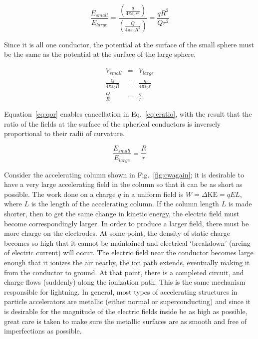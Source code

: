 \documentclass[12pt]{article}
\begin{document}
\begin{flushleft}
\begin{equation}
\frac{E_{small}}{E_{large}} = \frac{\left(\frac{q}{4\pi\varepsilon_{0}r^{2}}\right)}{\left( \frac{Q}{4\pi\varepsilon_{0}R^{2}} \right)}
=\frac{ qR^{2} }{ Qr^{2} }
\label{eq:eratio}
\end{equation}  

Since it is all one conductor, the potential at the surface of the small sphere must be the same as the potential at the surface of the large sphere,

\begin{eqnarray}
V_{small} & = & V_{large} \nonumber \\
\frac{Q}{4\pi\varepsilon_{0}R} & = & \frac{q}{4\pi\varepsilon_{0}r} \nonumber \\
\frac{Q}{R} & = & \frac{q}{r} \label{eq:qor}
\end{eqnarray}

Equation~\ref{eq:qor} enables cancellation in Eq.~\ref{eq:eratio}, with the result that the ratio of the fields at the surface of the spherical conductors is inversely proportional to their radii of curvature.

\begin{equation*}
\frac{E_{small}}{E_{large}} =\frac{ R }{ r }
\end{equation*}  

Consider the accelerating column shown in Fig.~\ref{fig:cwagain}; it is desirable to have a very large accelerating field in the column so that it can be as short as possible.  The work done on a charge $q$ in a uniform field is $W=\Delta \mbox{KE}= qEL$, where $L$ is the length of the accelerating column.  If the column length $L$ is made shorter, then to get the same change in kinetic energy, the electric field must become correspondingly larger.  In order to produce a larger field, there must be more charge on the electrodes.  At some point, the density of static charge becomes so high that it cannot be maintained and electrical `breakdown' (arcing of electric current) will occur.  The electric field near the conductor becomes large enough that it ionizes the air nearby, the ion path extends, eventually making it from the conductor to ground.  At that point, there is a completed circuit, and charge flows (suddenly) along the ionization path.  This is the same mechanism responsible for lightning.  In general, most types of accelerating structures in particle accelerators are metallic (either normal or superconducting) and since it is desirable for the magnitude of the electric fields inside be as high as possible, great care is taken to make sure the metallic surfaces are as smooth and free of imperfections as possible.



\end{flushleft}
\end{document}

